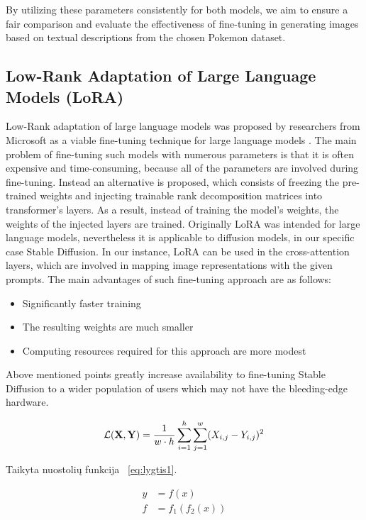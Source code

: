 \documentclass[conference]{IEEEtran}
\begin{document}
By utilizing these parameters consistently for both models, we aim to ensure a fair comparison and evaluate the effectiveness of fine-tuning in generating images based on textual descriptions from the chosen Pokemon dataset.

\subsection{Low-Rank Adaptation of Large Language Models (LoRA)}
Low-Rank adaptation of large language models was proposed by researchers from Microsoft as a viable fine-tuning technique for large language models \cite{hu2021lora}. The main problem of fine-tuning such models with numerous parameters is that it is often expensive and time-consuming, because all of the parameters are involved during fine-tuning. Instead an alternative is proposed, which consists of freezing the pre-trained weights and injecting trainable rank decomposition matrices into transformer's layers. As a result, instead of training the model's weights, the weights of the injected layers are trained. Originally LoRA was intended for large language models, nevertheless it is applicable to diffusion models, in our specific case Stable Diffusion. In our instance, LoRA can be used in the cross-attention layers, which are involved in mapping image representations with the given prompts. The main advantages of such fine-tuning approach are as follows:
\begin{itemize}
\item Significantly faster training
\item The resulting weights are much smaller
\item Computing resources required for this approach are more modest
\end{itemize}

Above mentioned points greatly increase availability to fine-tuning Stable Diffusion to a wider population of users which may not have the bleeding-edge hardware.

\begin{equation}
\mathcal{L}({\bf X}, {\bf Y}) = \frac{1}{w \cdot h} \sum_{i=1}^h \sum_{j=1}^w (X_{i, j} - Y_{i, j})^2
\label{eq:lygtis1}
\end{equation}

Taikyta nuostolių funkcija ~\eqref{eq:lygtis1}.

\begin{align}
y & = f(x) \nonumber \\
f & = f_1(f_2(x))
\label{eq:lygtis2}
\end{align}
\end{document}

